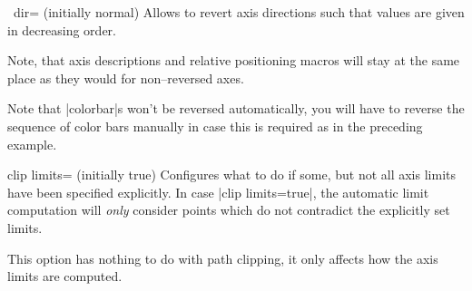 \begin{pgfplotsxykey}{\x\ dir= (initially normal)}
	Allows to revert axis directions such that values are given in decreasing order.
\label{key:pgfplots:xydir}
\begin{codeexample}[]
\end{codeexample}

\begin{codeexample}[]
\end{codeexample}

	Note, that axis descriptions and relative positioning macros will stay at the same place as they would for non--reversed axes.
\begin{codeexample}[]
\end{codeexample}

	Note that |colorbar|s won't be reversed automatically, you will have to reverse the sequence of color bars manually in case this is required as in the preceding example.
\end{pgfplotsxykey}

\begin{pgfplotskey}{clip limits= (initially true)}
	Configures what to do if some, but not all axis limits have been specified explicitly. In case |clip limits=true|, the automatic limit computation will \emph{only} consider points which do not contradict the explicitly set limits. 

	This option has nothing to do with path clipping, it only affects how the axis limits are computed.
\end{pgfplotskey}


